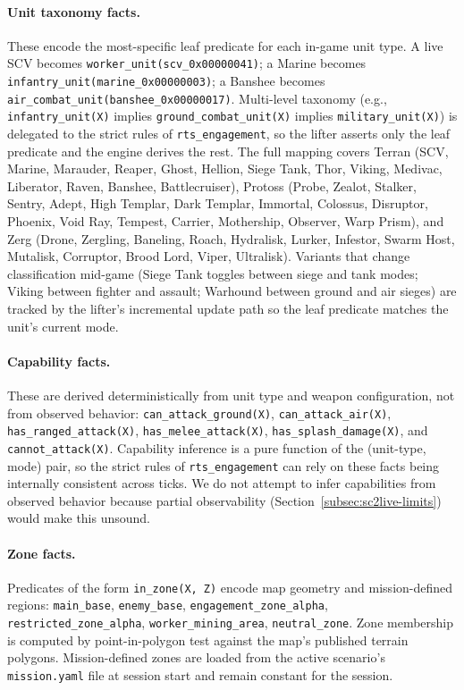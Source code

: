 \documentclass{article}
\theoremstyle{definition}
\begin{document}
\paragraph{Unit taxonomy facts.} These encode the most-specific leaf predicate for each in-game unit type. A live SCV becomes \texttt{worker\_unit(scv\_0x00000041)}; a Marine becomes \texttt{infantry\_unit(marine\_0x00000003)}; a Banshee becomes \texttt{air\_combat\_unit(banshee\_0x00000017)}. Multi-level taxonomy (e.g., \texttt{infantry\_unit(X)} implies \texttt{ground\_combat\_unit(X)} implies \texttt{military\_unit(X)}) is delegated to the strict rules of \texttt{rts\_engagement}, so the lifter asserts only the leaf predicate and the engine derives the rest. The full mapping covers Terran (SCV, Marine, Marauder, Reaper, Ghost, Hellion, Siege Tank, Thor, Viking, Medivac, Liberator, Raven, Banshee, Battlecruiser), Protoss (Probe, Zealot, Stalker, Sentry, Adept, High Templar, Dark Templar, Immortal, Colossus, Disruptor, Phoenix, Void Ray, Tempest, Carrier, Mothership, Observer, Warp Prism), and Zerg (Drone, Zergling, Baneling, Roach, Hydralisk, Lurker, Infestor, Swarm Host, Mutalisk, Corruptor, Brood Lord, Viper, Ultralisk). Variants that change classification mid-game (Siege Tank toggles between siege and tank modes; Viking between fighter and assault; Warhound between ground and air sieges) are tracked by the lifter's incremental update path so the leaf predicate matches the unit's current mode.

\paragraph{Capability facts.} These are derived deterministically from unit type and weapon configuration, not from observed behavior: \texttt{can\_attack\_ground(X)}, \texttt{can\_attack\_air(X)}, \texttt{has\_ranged\_attack(X)}, \texttt{has\_melee\_attack(X)}, \texttt{has\_splash\_damage(X)}, and \texttt{cannot\_attack(X)}. Capability inference is a pure function of the (unit-type, mode) pair, so the strict rules of \texttt{rts\_engagement} can rely on these facts being internally consistent across ticks. We do not attempt to infer capabilities from observed behavior because partial observability (Section~\ref{subsec:sc2live-limits}) would make this unsound.

\paragraph{Zone facts.} Predicates of the form \texttt{in\_zone(X, Z)} encode map geometry and mission-defined regions: \texttt{main\_base}, \texttt{enemy\_base}, \texttt{engagement\_zone\_alpha}, \texttt{restricted\_zone\_alpha}, \texttt{worker\_mining\_area}, \texttt{neutral\_zone}. Zone membership is computed by point-in-polygon test against the map's published terrain polygons. Mission-defined zones are loaded from the active scenario's \texttt{mission.yaml} file at session start and remain constant for the session.
\end{document}
